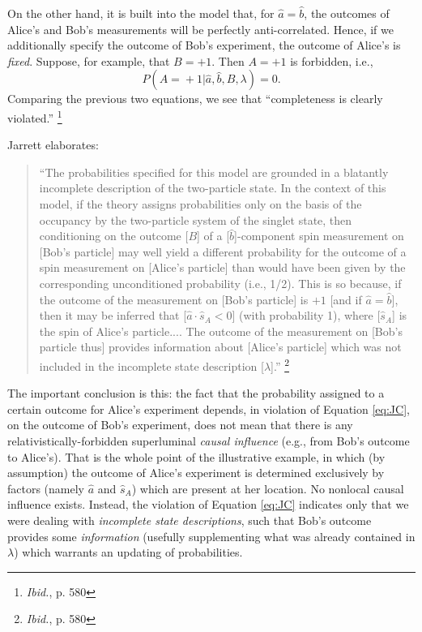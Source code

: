 \documentclass[12pt]{article}
\begin{document}
On the other hand, it is built into the model that, for $\hat{a} =
\hat{b}$, the outcomes of Alice's and Bob's measurements will be
perfectly anti-correlated.  Hence, if we additionally specify the
outcome of Bob's experiment, the outcome of Alice's is \emph{fixed}.
Suppose, for example, that $B = +1$.  Then $A = +1$ is forbidden,
i.e., 
\begin{equation}
P (A \! = \! +1  | \hat{a}, \hat{b}, B, \lambda) = 0. 
\label{eq:comp2}
\end{equation}
Comparing the previous two equations, we see that ``completeness is
clearly violated.''  \footnote{\emph{Ibid.}, p. 580}


Jarrett elaborates: 
\begin{quote}
``The probabilities specified for this model are
grounded in a blatantly incomplete description of the two-particle
state.  In the context of this model, if the theory assigns
probabilities only on the basis of the occupancy by the two-particle 
system of the singlet state, then conditioning on the outcome [$B$] of a
[$\hat{b}$]-component spin measurement on [Bob's particle] may well
yield a different probability for the outcome of a spin measurement on
[Alice's particle] than would have been given by the corresponding
unconditioned probability (i.e., 1/2).  This is so because, if the
outcome of the measurement on [Bob's particle] is $+1$ [and if
$\hat{a} = \hat{b}$], then it may be
inferred that [$\hat{a} \cdot \hat{s}_A < 0 $] (with probability 1),
where [$\hat{s}_A$] is the spin of Alice's particle....
The outcome of the measurement on [Bob's particle thus] provides
information about [Alice's particle] which was not included in the
incomplete state description [$\lambda$].''  \footnote{\emph{Ibid.},
  p. 580}
\end{quote}
The important conclusion is this:
the fact that the probability assigned to a certain outcome
for Alice's experiment 
depends, in violation of Equation \ref{eq:JC}, on the
outcome of Bob's experiment, does not mean that there is any
relativistically-forbidden superluminal \emph{causal influence} (e.g.,
from Bob's outcome to Alice's).  
That is the whole point of the illustrative example, in
which (by assumption) the outcome of Alice's experiment is determined
exclusively by factors (namely $\hat{a}$ and $\hat{s}_A$) which are
present at her location.  No nonlocal causal influence exists.  
Instead, the violation of Equation \ref{eq:JC} indicates only that we
were dealing with \emph{incomplete state descriptions}, such that
Bob's outcome provides some \emph{information} (usefully supplementing
what was already contained in $\lambda$) which warrants an updating of
probabilities.  
\end{document}
